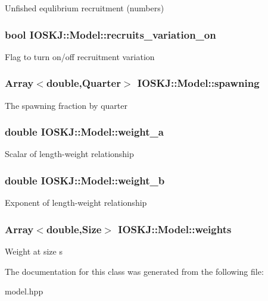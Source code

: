 Unfished equlibrium recruitment (numbers) \hypertarget{classIOSKJ_1_1Model_a164e3c054caea071da7079d5ff27833b}{
\subsubsection[{recruits\-\_\-variation\-\_\-on}]{\setlength{\rightskip}{0pt plus 5cm}bool I\-O\-S\-K\-J\-::\-Model\-::recruits\-\_\-variation\-\_\-on}}\label{classIOSKJ_1_1Model_a164e3c054caea071da7079d5ff27833b}
Flag to turn on/off recruitment variation \hypertarget{classIOSKJ_1_1Model_a81bffc6707aa313f87bf21dbbf1d8143}{
\subsubsection[{spawning}]{\setlength{\rightskip}{0pt plus 5cm}Array$<$double,Quarter$>$ I\-O\-S\-K\-J\-::\-Model\-::spawning}}\label{classIOSKJ_1_1Model_a81bffc6707aa313f87bf21dbbf1d8143}
The spawning fraction by quarter \hypertarget{classIOSKJ_1_1Model_a39f409e1010b3f2d1559366a7f7daad8}{
\subsubsection[{weight\-\_\-a}]{\setlength{\rightskip}{0pt plus 5cm}double I\-O\-S\-K\-J\-::\-Model\-::weight\-\_\-a}}\label{classIOSKJ_1_1Model_a39f409e1010b3f2d1559366a7f7daad8}
Scalar of length-\/weight relationship \hypertarget{classIOSKJ_1_1Model_aca953740b9305b51d39e04bc1b19ebb5}{
\subsubsection[{weight\-\_\-b}]{\setlength{\rightskip}{0pt plus 5cm}double I\-O\-S\-K\-J\-::\-Model\-::weight\-\_\-b}}\label{classIOSKJ_1_1Model_aca953740b9305b51d39e04bc1b19ebb5}
Exponent of length-\/weight relationship \hypertarget{classIOSKJ_1_1Model_a9befb275d915c5cec6b1e0e7a4bc8791}{
\subsubsection[{weights}]{\setlength{\rightskip}{0pt plus 5cm}Array$<$double,Size$>$ I\-O\-S\-K\-J\-::\-Model\-::weights}}\label{classIOSKJ_1_1Model_a9befb275d915c5cec6b1e0e7a4bc8791}
Weight at size s 

The documentation for this class was generated from the following file\-:\begin{DoxyCompactItemize}
\item 
model.\-hpp\end{DoxyCompactItemize}
